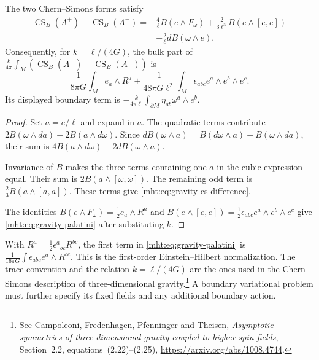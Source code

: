 \begin{proposition}\label{mht:prop:gravity-action-normalization}
The two Chern--Simons forms satisfy
\begin{equation}\label{mht:eq:gravity-cs-difference}
 \begin{split}
 \operatorname{CS}_B(A^+)-\operatorname{CS}_B(A^-)
 ={}&\frac4\ell B(e\wedge F_\omega)
       +\frac{2}{3\ell^3}B(e\wedge[e,e])\\
    &-\frac2\ell dB(\omega\wedge e).
 \end{split}
\end{equation}
Consequently, for $k=\ell/(4G)$, the bulk part of
$\frac{k}{4\pi}\int_M(\operatorname{CS}_B(A^+)-
\operatorname{CS}_B(A^-))$ is
\begin{equation}\label{mht:eq:gravity-palatini}
 \frac1{8\pi G}\int_M e_a\wedge R^a
 +\frac1{48\pi G\ell^2}\int_M
       \epsilon_{abc}e^a\wedge e^b\wedge e^c.
\end{equation}
Its displayed boundary term is
$-\frac{k}{4\pi\ell}\int_{\partial M}\eta_{ab}\omega^a\wedge e^b$.
\end{proposition}

\begin{proof}
Set $a=e/\ell$ and expand in $a$.
The quadratic terms contribute
$2B(\omega\wedge da)+2B(a\wedge d\omega)$.
Since
$dB(\omega\wedge a)=B(d\omega\wedge a)-B(\omega\wedge da)$,
their sum is $4B(a\wedge d\omega)-2dB(\omega\wedge a)$.

Invariance of $B$ makes the three terms containing one $a$ in
the cubic expression equal. Their sum is
$2B(a\wedge[\omega,\omega])$.
The remaining odd term is $\frac23B(a\wedge[a,a])$.
These terms give \eqref{mht:eq:gravity-cs-difference}.

The identities
$B(e\wedge F_\omega)=\frac12e_a\wedge R^a$ and
$B(e\wedge[e,e])=\frac12\epsilon_{abc}e^a\wedge e^b\wedge e^c$
give \eqref{mht:eq:gravity-palatini} after substituting $k$.
\end{proof}

With $R^a=\frac12\epsilon^a{}_{bc}R^{bc}$, the first term
in \eqref{mht:eq:gravity-palatini} is
$\frac1{16\pi G}\int\epsilon_{abc}e^a\wedge R^{bc}$.
This is the first-order Einstein--Hilbert normalization.
The trace convention and the relation $k=\ell/(4G)$ are the
ones used in the Chern--Simons description of three-dimensional
gravity.\footnote{See Campoleoni, Fredenhagen, Pfenninger and Theisen,
\emph{Asymptotic symmetries of three-dimensional gravity coupled to
higher-spin fields}, Section~2.2, equations~(2.22)--(2.25),
\url{https://arxiv.org/abs/1008.4744}.}
A boundary variational problem must further specify its fixed
fields and any additional boundary action.

